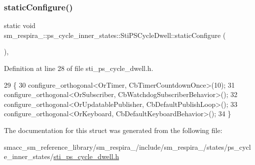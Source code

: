 \subsubsection{\texorpdfstring{static\+Configure()}{staticConfigure()}}
{\footnotesize\ttfamily static void sm\+\_\+respira\+\_\+::ps\+\_\+cycle\+\_\+inner\+\_\+states\+::\+Sti\+P\+S\+Cycle\+Dwell\+::static\+Configure (\begin{DoxyParamCaption}{ }\end{DoxyParamCaption})\hspace{0.3cm}{\ttfamily [inline]}, {\ttfamily [static]}}



Definition at line 28 of file sti\+\_\+ps\+\_\+cycle\+\_\+dwell.\+h.


\begin{DoxyCode}
29   \{
30     configure\_orthogonal<OrTimer, CbTimerCountdownOnce>(10);
31     configure\_orthogonal<OrSubscriber, CbWatchdogSubscriberBehavior>();
32     configure\_orthogonal<OrUpdatablePublisher, CbDefaultPublishLoop>();
33     configure\_orthogonal<OrKeyboard, CbDefaultKeyboardBehavior>();
34   \}
\end{DoxyCode}


The documentation for this struct was generated from the following file\+:\begin{DoxyCompactItemize}
\item 
smacc\+\_\+sm\+\_\+reference\+\_\+library/sm\+\_\+respira\+\_/include/sm\+\_\+respira\+\_/states/ps\+\_\+cycle\+\_\+inner\+\_\+states/\hyperlink{sti__ps__cycle__dwell_8h}{sti\+\_\+ps\+\_\+cycle\+\_\+dwell.\+h}\end{DoxyCompactItemize}
